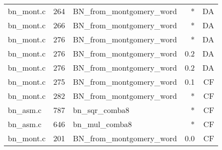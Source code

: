 \begin{table}[!ht]
\begin{tabular}{lrlrr}
bn\_mont.c& 264&BN\_from\_montgomery\_word&*&DA\\
bn\_mont.c& 266&BN\_from\_montgomery\_word&*&DA\\
bn\_mont.c& 276&BN\_from\_montgomery\_word&*&DA\\
bn\_mont.c& 276&BN\_from\_montgomery\_word&0.2 &DA\\
bn\_mont.c& 276&BN\_from\_montgomery\_word&0.2 &DA\\
bn\_mont.c& 275&BN\_from\_montgomery\_word&0.1 &CF\\
bn\_mont.c& 282&BN\_from\_montgomery\_word&*&CF\\
bn\_asm.c& 787&bn\_sqr\_comba8&*&CF\\
bn\_asm.c& 646&bn\_mul\_comba8&*&CF\\
bn\_mont.c& 201&BN\_from\_montgomery\_word&0.0 &CF\\
\hline
\end{tabular}
\renewcommand{\baselinestretch}{1.0}\selectfont
\end{table}
